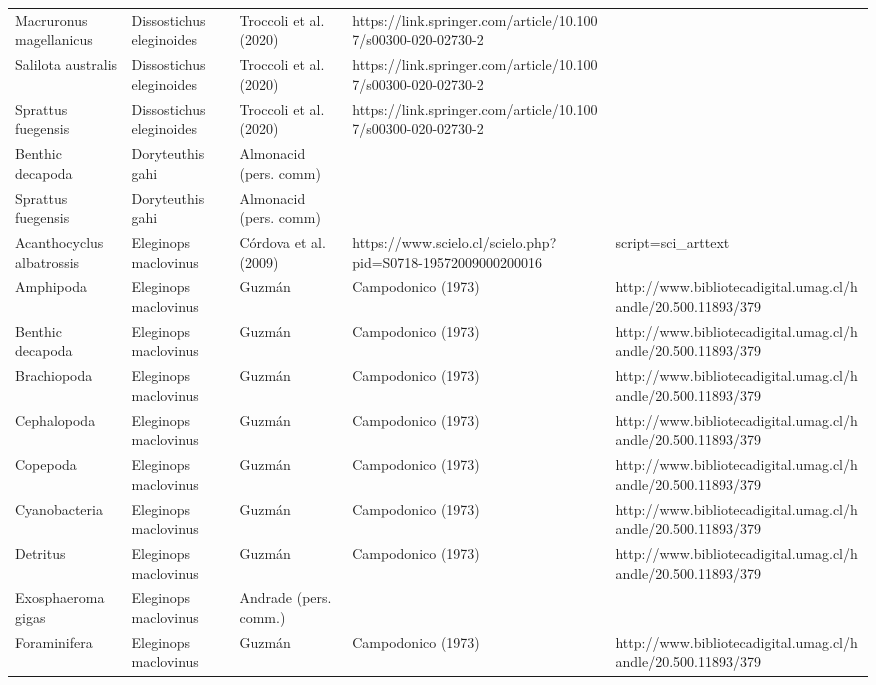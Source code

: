 \documentclass[
]{article}
\begin{document}
\begin{landscape}
\begin{longtable}[t]{>{\raggedright\arraybackslash}p{4cm}>{\centering\arraybackslash}p{4cm}>{\centering\arraybackslash}p{6cm}>{\centering\arraybackslash}p{6cm}}
Macruronus magellanicus & Dissostichus eleginoides & \tiny Troccoli et al. (2020) & \tiny https://link.springer.com/article/10.1007/s00300-020-02730-2\\
Salilota australis & Dissostichus eleginoides & \tiny Troccoli et al. (2020) & \tiny https://link.springer.com/article/10.1007/s00300-020-02730-2\\
Sprattus fuegensis & Dissostichus eleginoides & \tiny Troccoli et al. (2020) & \tiny https://link.springer.com/article/10.1007/s00300-020-02730-2\\
\addlinespace
Benthic decapoda & Doryteuthis gahi & \tiny Almonacid (pers. comm) & \tiny\\
Sprattus fuegensis & Doryteuthis gahi & \tiny Almonacid (pers. comm) & \tiny\\
Acanthocyclus albatrossis & Eleginops maclovinus & \tiny Córdova et al. (2009) & \tiny https://www.scielo.cl/scielo.php?pid=S0718-19572009000200016&script=sci_arttext\\
Amphipoda & Eleginops maclovinus & \tiny Guzmán & Campodonico (1973) & \tiny http://www.bibliotecadigital.umag.cl/handle/20.500.11893/379\\
Benthic decapoda & Eleginops maclovinus & \tiny Guzmán & Campodonico (1973) & \tiny http://www.bibliotecadigital.umag.cl/handle/20.500.11893/379\\
\addlinespace
Brachiopoda & Eleginops maclovinus & \tiny Guzmán & Campodonico (1973) & \tiny http://www.bibliotecadigital.umag.cl/handle/20.500.11893/379\\
Cephalopoda & Eleginops maclovinus & \tiny Guzmán & Campodonico (1973) & \tiny http://www.bibliotecadigital.umag.cl/handle/20.500.11893/379\\
Copepoda & Eleginops maclovinus & \tiny Guzmán & Campodonico (1973) & \tiny http://www.bibliotecadigital.umag.cl/handle/20.500.11893/379\\
Cyanobacteria & Eleginops maclovinus & \tiny Guzmán & Campodonico (1973) & \tiny http://www.bibliotecadigital.umag.cl/handle/20.500.11893/379\\
Detritus & Eleginops maclovinus & \tiny Guzmán & Campodonico (1973) & \tiny http://www.bibliotecadigital.umag.cl/handle/20.500.11893/379\\
\addlinespace
Exosphaeroma gigas & Eleginops maclovinus & \tiny Andrade (pers. comm.) & \tiny\\
Foraminifera & Eleginops maclovinus & \tiny Guzmán & Campodonico (1973) & \tiny http://www.bibliotecadigital.umag.cl/handle/20.500.11893/379\\

\end{longtable}
\end{landscape}
\end{document}
